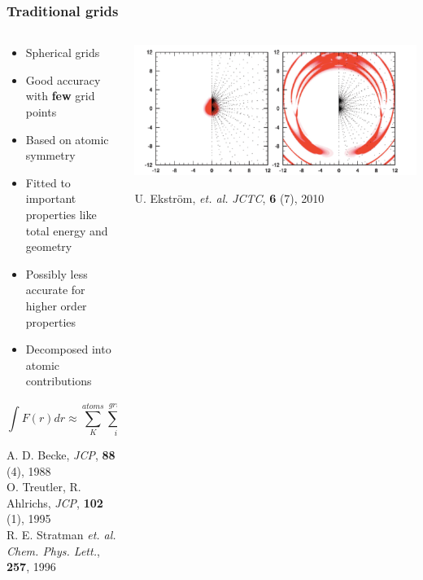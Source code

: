 \begin{frame}
    \frametitle{Traditional grids}
    \begin{columns}
    \begin{column}{0.6\linewidth}
    \centering

    \vspace{10mm}

    \begin{itemize}
        \item Spherical grids
        \item Good accuracy with \textbf{few} grid points
        \item Based on atomic symmetry
        \item Fitted to important properties like total energy and geometry
        \item Possibly less accurate for higher order properties
        \item Decomposed into atomic contributions
    \end{itemize}

    \vspace{2mm}

    \begin{equation}
        \nonumber
        \int F(r) dr \approx \sum_K^{atoms} \sum_i^{grid} \omega_K(r_i) F(r_i)
    \end{equation}

    \vspace{15mm}

    \scriptsize
    A. D. Becke, 
    {\it JCP}, \textbf{88} (4), 1988\\
    O. Treutler, R. Ahlrichs,
    {\it JCP}, \textbf{102} (1), 1995\\
    R. E. Stratman {\it et. al.}
    {\it Chem. Phys. Lett.}, \textbf{257}, 1996
    
    \end{column}

    \begin{column}{0.4\linewidth}
    \centering
    \includegraphics[clip, viewport = 0 0 650 350, angle=-90, scale=0.3]{figures/radialgrid.pdf}

    \vspace {2mm}

    \scriptsize
    U. Ekstr\"{o}m, {\it et. al.}
    {\it JCTC}, \textbf{6} (7), 2010
    \end{column}
    \end{columns}
\end{frame}

